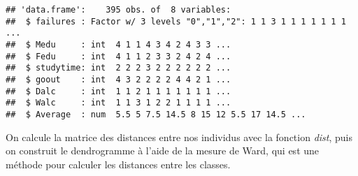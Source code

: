 \documentclass[
]{article}
\newenvironment{Shaded}{\begin{snugshade}}{\end{snugshade}}
\newcommand{\ControlFlowTok}[1]{\textcolor[rgb]{0.13,0.29,0.53}{\textbf{#1}}}
\newcommand{\DecValTok}[1]{\textcolor[rgb]{0.00,0.00,0.81}{#1}}
\newcommand{\FunctionTok}[1]{\textcolor[rgb]{0.00,0.00,0.00}{#1}}
\newcommand{\NormalTok}[1]{#1}
\newcommand{\OtherTok}[1]{\textcolor[rgb]{0.56,0.35,0.01}{#1}}
\newcommand{\SpecialCharTok}[1]{\textcolor[rgb]{0.00,0.00,0.00}{#1}}
\newcommand{\StringTok}[1]{\textcolor[rgb]{0.31,0.60,0.02}{#1}}
\begin{document}
\begin{Shaded}
\end{Shaded}

\begin{verbatim}
## 'data.frame':    395 obs. of  8 variables:
##  $ failures : Factor w/ 3 levels "0","1","2": 1 1 3 1 1 1 1 1 1 1 ...
##  $ Medu     : int  4 1 1 4 3 4 2 4 3 3 ...
##  $ Fedu     : int  4 1 1 2 3 3 2 4 2 4 ...
##  $ studytime: int  2 2 2 3 2 2 2 2 2 2 ...
##  $ goout    : int  4 3 2 2 2 2 4 4 2 1 ...
##  $ Dalc     : int  1 1 2 1 1 1 1 1 1 1 ...
##  $ Walc     : int  1 1 3 1 2 2 1 1 1 1 ...
##  $ Average  : num  5.5 5 7.5 14.5 8 15 12 5.5 17 14.5 ...
\end{verbatim}

On calcule la matrice des distances entre nos individus avec la fonction
\emph{dist}, puis on construit le dendrogramme à l'aide de la mesure de
Ward, qui est une méthode pour calculer les distances entre les classes.
\end{document}
